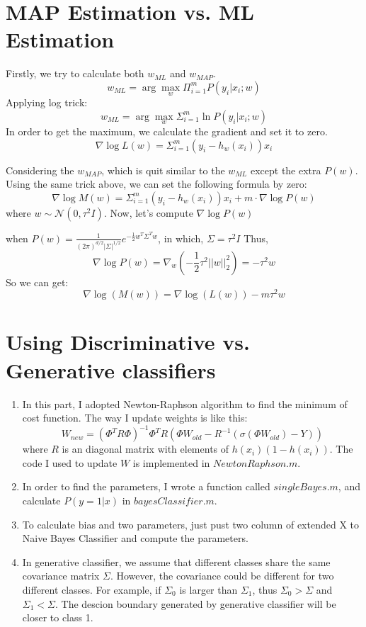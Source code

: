 \documentclass[a4paper, 12pt, titlepage]{article}
\begin{document}
\section{MAP Estimation vs. ML Estimation}
Firstly, we try to calculate both $w_{ML}$ and $w_{MAP}$.
$$w_{ML}=\arg\max_w\Pi^m_{i=1}P(y_i|x_i;w)$$
Applying log trick:
$$w_{ML}=\arg\max_w\Sigma^m_{i=1}\ln{P(y_i|x_i;w)}$$
In order to get the maximum, we calculate the gradient and set it to zero.
$$\nabla{}\log{L(w)}=\Sigma^m_{i=1}(y_i-h_w(x_i))x_i$$

Considering the $w_{MAP}$, which is quit similar to the $w_{ML}$ except the extra $P(w)$. Using the same trick above, we can set the following formula by zero:
$$\nabla{}\log{M(w)}=\Sigma^m_{i=1}(y_i-h_w(x_i))x_i+m\cdot\nabla{}\log{P(w)}$$
where $w\sim\mathcal{N}(0, \tau^2I)$.
Now, let's compute $\nabla\log{P(w)}$ 

when $P(w) = \frac{1}{(2\pi)^{d/2}|\Sigma|^{1/2}}e^{-\frac{1}{2}w^T\Sigma^Tw}$, in which, $\Sigma=\tau^2I$
Thus, 
$$\nabla\log{P(w)} = \nabla_w(-\frac{1}{2}\tau^2||w||^2_2)=-\tau^2w$$
So we can get:
$$\nabla\log(M(w)) = \nabla\log(L(w)) -m\tau^2w$$






\section{Using Discriminative vs. Generative classifiers}
\begin{enumerate}
        \item In this part, I adopted Newton-Raphson algorithm to find the minimum of cost function. The way I update weights is like this:
            $$W_{new}=(\Phi^TR\Phi)^{-1}\Phi^TR(\Phi{}W_{old}-R^{-1}(\sigma(\Phi{}W_{old})-Y))$$
            where $R$ is an diagonal matrix with elements of $h(x_i)(1-h(x_i))$.
            The code I used to update $W$ is implemented in $NewtonRaphson.m$.
        \item In order to find the parameters, I wrote a function called $singleBayes.m$, and calculate $P(y=1|x)$ in $bayesClassifier.m$.
        \item To calculate bias and two parameters, just pust two column of extended X to Naive Bayes Classifier and compute the parameters.
    \item In generative classifier, we assume that different classes share the same covariance matrix $\Sigma$. However, the covariance could be different for two different classes. For example, if $\Sigma_0$ is larger than $\Sigma_1$, thus $\Sigma_0>\Sigma$ and $\Sigma_1<\Sigma$. The descion boundary generated by generative classifier will be closer to class 1.
\end{enumerate}
\end{document}
